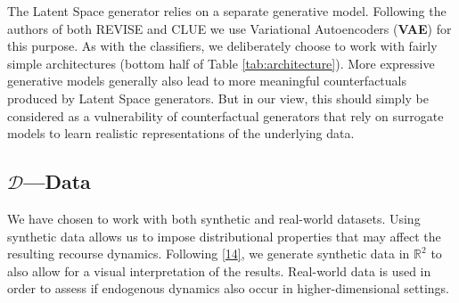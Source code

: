 \documentclass[conference,final,]{IEEEtran}
\theoremstyle{definition}
\theoremstyle{definition}
\theoremstyle{definition}
\theoremstyle{definition}
\theoremstyle{remark}
\begin{document}
The Latent Space generator relies on a separate generative model. Following the authors of both REVISE and CLUE we use Variational Autoencoders (\textbf{VAE}) for this purpose. As with the classifiers, we deliberately choose to work with fairly simple architectures (bottom half of Table \ref{tab:architecture}). More expressive generative models generally also lead to more meaningful counterfactuals produced by Latent Space generators. But in our view, this should simply be considered as a vulnerability of counterfactual generators that rely on surrogate models to learn realistic representations of the underlying data.

\begin{table}

\caption{\label{tab:architecture}Neural network architectures and training parameters.}
\centering
{}
\end{table}

\hypertarget{empirical-data}{%
\subsection{\texorpdfstring{\(\mathcal{D}\)---Data}{\textbackslash mathcal\{D\}---Data}}\label{empirical-data}}

We have chosen to work with both synthetic and real-world datasets. Using synthetic data allows us to impose distributional properties that may affect the resulting recourse dynamics. Following \protect\hyperlink{ref-upadhyay2021robust}{{[}14{]}}, we generate synthetic data in \(\mathbb{R}^2\) to also allow for a visual interpretation of the results. Real-world data is used in order to assess if endogenous dynamics also occur in higher-dimensional settings.
\end{document}

